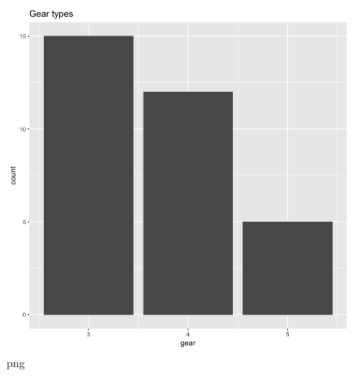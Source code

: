 \begin{figure}
\centering
\includegraphics{test_section_files/test_section_2_1.png}
\caption{png}
\end{figure}
